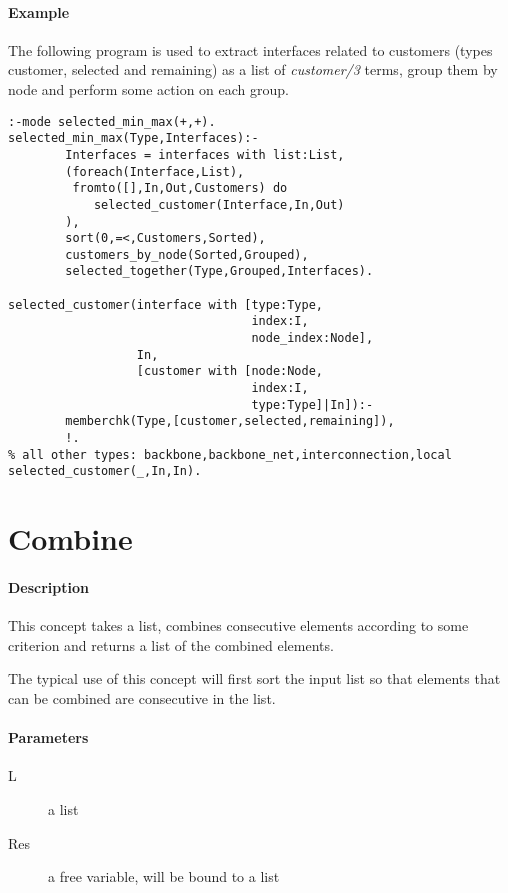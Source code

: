 \documentclass[a4paper,12pt]{report}
\begin{document}
\paragraph{Example}
The following program is used to extract interfaces related to customers (types customer, selected and remaining) as a list of {\it customer/3} terms, group them by node and perform some action on each group.
\begin{verbatim}
:-mode selected_min_max(+,+).
selected_min_max(Type,Interfaces):-
        Interfaces = interfaces with list:List,
        (foreach(Interface,List),
         fromto([],In,Out,Customers) do
            selected_customer(Interface,In,Out)
        ),
        sort(0,=<,Customers,Sorted),
        customers_by_node(Sorted,Grouped),
        selected_together(Type,Grouped,Interfaces).

selected_customer(interface with [type:Type,
                                  index:I,
                                  node_index:Node],
                  In,
                  [customer with [node:Node,
                                  index:I,
                                  type:Type]|In]):-
        memberchk(Type,[customer,selected,remaining]),
        !.
% all other types: backbone,backbone_net,interconnection,local
selected_customer(_,In,In).
\end{verbatim}

\pagebreak
\section{Combine}
\paragraph{Description}
This concept takes a list, combines consecutive elements according to some criterion and returns a list of the combined elements.

The typical use of this concept will first sort the input list so that elements that can be combined are consecutive in the list.
\paragraph{Parameters}
\begin{description}
\item[L] a list
\item[Res] a free variable, will be bound to a list
\end{description}
\end{document}
